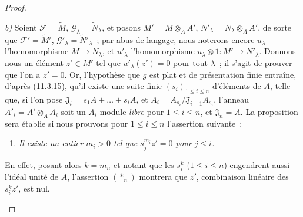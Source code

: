\begin{proof}
\begin{enumerate}[label=(\roman*)]
  \emph{b)} Soient $\mathcal F=\widetilde M$,
  $\mathcal G_\lambda=\widetilde N_\lambda$, et posons
  $M'=M\otimes_A A'$, $N'_\lambda=N_\lambda\otimes_A A'$, de sorte que
  $\mathcal F'=\widetilde{M}'$, $\mathcal G'_\lambda=\widetilde{N}'_\lambda$~;
  par abus de langage, nous noterons encore $u_\lambda$ l'homomorphisme
  $M\to N_\lambda$, et $u'_\lambda$ l'homomorphisme
  $u_\lambda\otimes 1:M'\to N'_\lambda$. Donnons-nous un élément $z'\in M'$
  tel que $u'_\lambda(z')=0$ pour tout $\lambda$~; il s'agit de prouver que
  l'on a $z'=0$. Or, l'hypothèse que $g$ est plat et de présentation finie
  entraîne, d'après (11.3.15), qu'il existe une suite finie
  $(s_i)_{1\leq i\leq n}$ d'éléments de $A$, telle que, si l'on pose
  $\mathfrak J_i=s_1A+\ldots+s_iA$, et
  $A_i=A_{s_i}/\mathfrak J_{i-1}A_{s_i}$, l'anneau
  $A'_i=A'\otimes_A A_i$ soit un $A_i$-module \emph{libre} pour
  $1\leq i\leq n$, et $\mathfrak J_n=A$. La proposition sera établie si nous
  prouvons pour $1\leq i\leq n$ l'assertion suivante~:
  \begin{enumerate}[label=$(*_i)$]
    \item \emph{Il existe un entier $m_i>0$ tel que $s_j^{m_i}z'=0$ pour
    $j\leq i$.}
  \end{enumerate}
  En effet, posant alors $k=m_n$ et notant que les $s_i^k$ ($1\leq i\leq n$)
  engendrent aussi l'idéal unité de $A$, l'assertion $(*_n)$ montrera que $z'$,
  combinaison linéaire des $s_i^kz'$, est nul.


\end{enumerate}
\end{proof}
